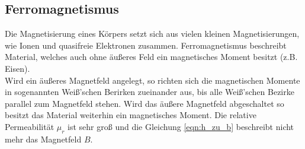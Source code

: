 \subsection{Ferromagnetismus}
Die Magnetisierung eines Körpers setzt sich aus vielen kleinen Magnetisierungen, wie Ionen und quasifreie Elektronen zusammen.
Ferromagnetismus beschreibt Material, welches auch ohne äußeres Feld ein magnetisches Moment besitzt (z.B. Eisen).\\
Wird ein äußeres Magnetfeld angelegt, so richten sich die magnetischen Momente in sogenannten Weiß'schen Berirken zueinander aus,
bis alle Weiß'schen Bezirke parallel zum Magnetfeld stehen. Wird das äußere Magnetfeld abgeschaltet so besitzt das Material weiterhin
ein magnetisches Moment. Die relative Permeabilität $\mu_r$ ist sehr groß und die Gleichung \eqref{eqn:h_zu_b} beschreibt nicht mehr
das Magnetfeld $B$.\\


